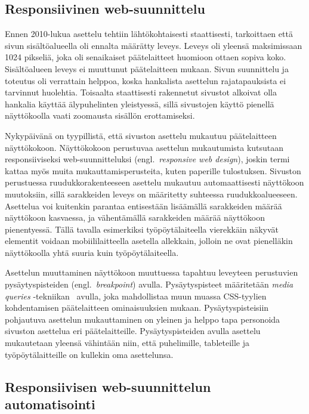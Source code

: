 \documentclass[finnish, 12pt, a4paper, elec, utf8, a-1b, online]{aaltothesis}
\begin{document}
\subsection*{Responsiivinen web-suunnittelu}

Ennen 2010-lukua asettelu tehtiin lähtökohtaisesti staattisesti, tarkoittaen
että sivun sisältöalueella oli ennalta määrätty leveys. Leveys oli yleensä
maksimissaan 1024 pikseliä, joka oli senaikaiset päätelaitteet huomioon ottaen sopiva
koko. Sisältöalueen leveys ei muuttunut päätelaitteen mukaan. Sivun suunnittelu
ja toteutus oli verrattain helppoa, koska hankalista asettelun rajatapauksista
ei tarvinnut huolehtia. Toisaalta staattisesti rakennetut sivustot alkoivat olla
hankalia käyttää älypuhelinten yleistyessä, sillä sivustojen käyttö pienellä
näyttökoolla vaati zoomausta sisällön erottamiseksi.

Nykypäivänä on tyypillistä, että sivuston asettelu mukautuu päätelaitteen
näyttökokoon. Näyttökokoon perustuvaa asettelun mukautumista kutsutaan
responsiiviseksi web-suunnitteluksi (engl.\ \textit{responsive web design}),
joskin termi kattaa myös muita mukauttamisperusteita, kuten paperille
tulostuksen. Sivuston perustuessa ruudukkorakenteeseen asettelu mukautuu
automaattisesti näyttökoon muutoksiin, sillä sarakkeiden leveys on määritetty
suhteessa ruudukkoalueeseen. Asettelua voi kuitenkin parantaa entisestään
lisäämällä sarakkeiden määrää näyttökoon kasvaessa, ja vähentämällä sarakkeiden
määrää näyttökoon pienentyessä. Tällä tavalla esimerkiksi työpöytälaiteella
vierekkäin näkyvät elementit voidaan mobiililaitteella asetella allekkain,
jolloin ne ovat pienelläkin näyttökoolla yhtä suuria kuin työpöytälaiteella.

Asettelun muuttaminen näyttökoon muuttuessa tapahtuu leveyteen perustuvien
pysäytyspisteiden (engl.\ \textit{breakpoint}) avulla. Pysäytyspisteet
määritetään \textit{media queries} -tekniikan~\cite{Rivoal:12:MQ} avulla, joka
mahdollistaa muun muassa CSS-tyylien kohdentamisen päätelaitteen ominaisuuksien
mukaan. Pysäytyspisteisiin pohjautuva asettelun mukauttaminen on yleinen ja
helppo tapa personoida sivuston asettelua eri päätelaitteille. Pysäytyspisteiden
avulla asettelu mukautetaan yleensä vähintään niin, että puhelimille,
tableteille ja työpöytälaitteille on kullekin oma asettelunsa.

\subsection*{Responsiivisen web-suunnittelun automatisointi}
\end{document}
